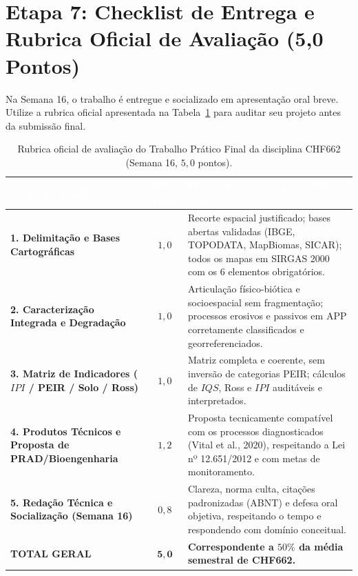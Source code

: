 \section{Etapa 7: Checklist de Entrega e Rubrica Oficial de Avaliação (5,0 Pontos)}

Na Semana 16, o trabalho é entregue e socializado em apresentação oral breve. Utilize a rubrica oficial apresentada na Tabela~\ref{tab:rubrica_tpf} para auditar seu projeto antes da submissão final.

\begin{table}[H]
\centering
\caption{Rubrica oficial de avaliação do Trabalho Prático Final da disciplina CHF662 (Semana 16, $5{,}0$ pontos).}
\label{tab:rubrica_tpf}
\renewcommand{\arraystretch}{1.20}
\small
\begin{tabularx}{\textwidth}{@{}p{3.6cm} c >{\raggedright\arraybackslash}X@{}}
  \toprule
  \rowcolor{uefsNavy}
  \textcolor{white}{\bfseries Critério Avaliativo} & \textcolor{white}{\bfseries Peso (pts)} & \textcolor{white}{\bfseries Descritor de Desempenho Pleno (100\%)} \\
  \midrule
  \textbf{1. Delimitação e Bases Cartográficas} & $1{,}0$ & Recorte espacial justificado; bases abertas validadas (IBGE, TOPODATA, MapBiomas, SICAR); todos os mapas em SIRGAS 2000 com os 6 elementos obrigatórios. \\
  \rowcolor{bgGray}
  \textbf{2. Caracterização Integrada e Degradação} & $1{,}0$ & Articulação físico-biótica e socioespacial sem fragmentação; processos erosivos e passivos em APP corretamente classificados e georreferenciados. \\
  \textbf{3. Matriz de Indicadores ($IPI$ / PEIR / Solo / Ross)} & $1{,}0$ & Matriz completa e coerente, sem inversão de categorias PEIR; cálculos de $IQS$, Ross e $IPI$ auditáveis e interpretados. \\
  \rowcolor{bgGray}
  \textbf{4. Produtos Técnicos e Proposta de PRAD/Bioengenharia} & $1{,}2$ & Proposta tecnicamente compatível com os processos diagnosticados (Vital et al., 2020), respeitando a Lei nº 12.651/2012 e com metas de monitoramento. \\
  \textbf{5. Redação Técnica e Socialização (Semana 16)} & $0{,}8$ & Clareza, norma culta, citações padronizadas (ABNT) e defesa oral objetiva, respeitando o tempo e respondendo com domínio conceitual. \\
  \midrule
  \textbf{TOTAL GERAL} & $\mathbf{5{,}0}$ & \textbf{Correspondente a $50\%$ da média semestral de CHF662.} \\
  \bottomrule
\end{tabularx}
\end{table}

